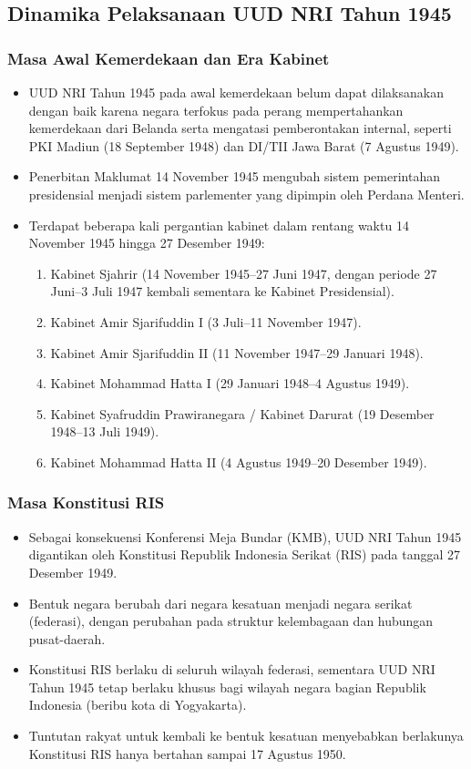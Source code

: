 \subsection{Dinamika Pelaksanaan UUD NRI Tahun 1945}

\subsubsection{Masa Awal Kemerdekaan dan Era Kabinet}
\begin{itemize}
\item UUD NRI Tahun 1945 pada awal kemerdekaan belum dapat dilaksanakan dengan baik karena negara terfokus pada perang mempertahankan kemerdekaan dari Belanda serta mengatasi pemberontakan internal, seperti PKI Madiun (18 September 1948) dan DI/TII Jawa Barat (7 Agustus 1949).
\item Penerbitan Maklumat 14 November 1945 mengubah sistem pemerintahan presidensial menjadi sistem parlementer yang dipimpin oleh Perdana Menteri.
\item Terdapat beberapa kali pergantian kabinet dalam rentang waktu 14 November 1945 hingga 27 Desember 1949:
  \begin{enumerate}
  \item Kabinet Sjahrir (14 November 1945--27 Juni 1947, dengan periode 27 Juni--3 Juli 1947 kembali sementara ke Kabinet Presidensial).
  \item Kabinet Amir Sjarifuddin I (3 Juli--11 November 1947).
  \item Kabinet Amir Sjarifuddin II (11 November 1947--29 Januari 1948).
  \item Kabinet Mohammad Hatta I (29 Januari 1948--4 Agustus 1949).
  \item Kabinet Syafruddin Prawiranegara / Kabinet Darurat (19 Desember 1948--13 Juli 1949).
  \item Kabinet Mohammad Hatta II (4 Agustus 1949--20 Desember 1949).
  \end{enumerate}
\end{itemize}

\subsubsection{Masa Konstitusi RIS}
\begin{itemize}
\item Sebagai konsekuensi Konferensi Meja Bundar (KMB), UUD NRI Tahun 1945 digantikan oleh Konstitusi Republik Indonesia Serikat (RIS) pada tanggal 27 Desember 1949.
\item Bentuk negara berubah dari negara kesatuan menjadi negara serikat (federasi), dengan perubahan pada struktur kelembagaan dan hubungan pusat-daerah.
\item Konstitusi RIS berlaku di seluruh wilayah federasi, sementara UUD NRI Tahun 1945 tetap berlaku khusus bagi wilayah negara bagian Republik Indonesia (beribu kota di Yogyakarta).
\item Tuntutan rakyat untuk kembali ke bentuk kesatuan menyebabkan berlakunya Konstitusi RIS hanya bertahan sampai 17 Agustus 1950.
\end{itemize}

